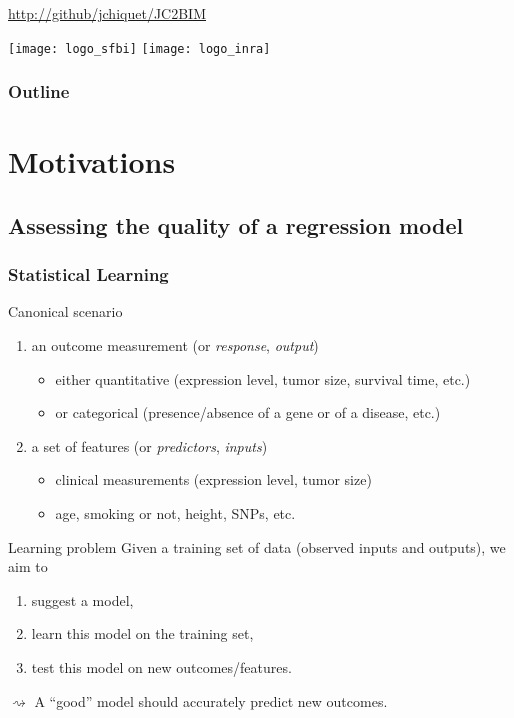 \documentclass[10pt, c, xcolor=x11names]{beamer}\usepackage[]{graphicx}\usepackage[]{color}
\title{\currentCourse}
\subtitle{\huge\currentChapter\normalsize}
\institute{\currentInstitute}
\date{\currentDate}
\newcommand{\dotitlepage}{%
  \begin{frame}
    \titlepage
    \vfill
    \begin{center}
        \scriptsize\url{http://github/jchiquet/JC2BIM}
    \end{center}
    \vfill
    \texttt{[image: logo\_sfbi]}\hfill
    \texttt{[image: logo\_inra]}
  \end{frame}
}
\newcommand{\dotoc}{%
  \begin{frame}
    \frametitle{Outline}
    \tableofcontents[currentsection,
    sectionstyle=show/show,
    subsectionstyle=hide]
  \end{frame}
}
\begin{document}
\dotitlepage

\dotoc

\section{Motivations}


\subsection{Assessing the quality of a regression model}

\begin{frame}
  \frametitle{Statistical Learning}

  \begin{block}{Canonical scenario}
    \begin{enumerate}
    \item an \alert{outcome} measurement (or \emph{response}, \emph{output})
      \begin{itemize}
      \item  either   quantitative  (expression  level,   tumor  size,
        survival time, etc.)
      \item or categorical (presence/absence of a gene or of a disease, etc.)
      \end{itemize}
    \item a set of  \alert{features} (or \emph{predictors}, \emph{inputs})
      \begin{itemize}
      \item clinical measurements (expression level, tumor size)
      \item age, smoking or not, height, SNPs, etc.
      \end{itemize}
    \end{enumerate}
  \end{block}

  \vfill

  \begin{block}{Learning problem} Given a training set of data (observed
    inputs and outputs), we aim to
    \begin{enumerate}
    \item suggest a model,
    \item learn this model on the training set,
    \item test this model on new outcomes/features.
    \end{enumerate}
  \end{block}

  \vfill

  $\rightsquigarrow$   \alert{A  ``good''   model  should   accurately
    predict new outcomes.}
\end{frame}
\end{document}
